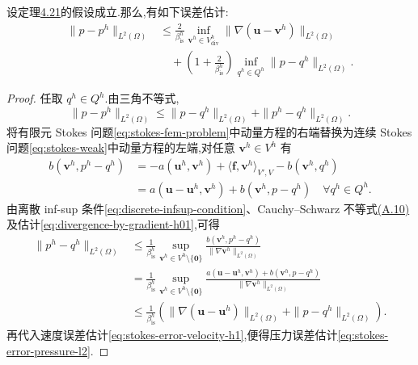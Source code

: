 \begin{theorem}\label{thm:stokes-error-pressure-l2}
设定理\hyperref[thm:stokes-error-velocity-h1]{4.21}的假设成立.那么,有如下误差估计:
\begin{equation}\label{eq:stokes-error-pressure-l2}
\begin{aligned}
  \|p-p^h\|_{L^2(\Omega)}
   &\leq\frac{2}{\beta_{\mathrm{is}}^h}
      \inf_{\bm{v}^h\in V_{\mathrm{div}}^h}
        \|\nabla(\bm{u}-\bm{v}^h)\|_{L^2(\Omega)}\\
   &\quad+\left(1+\frac{2}{\beta_{\mathrm{is}}^h}\right)
      \inf_{q^h\in Q^h}\|p-q^h\|_{L^2(\Omega)}.
\end{aligned}
\end{equation}
\end{theorem}
\begin{proof}
任取 $q^h\in Q^h$.由三角不等式,
\[
  \|p-p^h\|_{L^2(\Omega)}
   \leq\|p-q^h\|_{L^2(\Omega)}
       +\|p^h-q^h\|_{L^2(\Omega)}.
\]
将有限元 Stokes 问题\cref{eq:stokes-fem-problem}中动量方程的右端替换为连续 Stokes 问题\cref{eq:stokes-weak}中动量方程的左端,对任意 $\bm{v}^h\in V^h$ 有
\[
\begin{aligned}
  b(\bm{v}^h,p^h-q^h)
   &=-a(\bm{u}^h,\bm{v}^h)
       +\langle\bm{f},\bm{v}^h\rangle_{V',V}
       -b(\bm{v}^h,q^h)\\
   &=a(\bm{u}-\bm{u}^h,\bm{v}^h)
       +b(\bm{v}^h,p-q^h)
       \quad\forall q^h\in Q^h.
\end{aligned}
\]
由离散 inf-sup 条件\cref{eq:discrete-infsup-condition}、Cauchy--Schwarz 不等式\hyperref[eq:appendix-a-10]{(A.10)}及估计\cref{eq:divergence-by-gradient-h01},可得
\[
\begin{aligned}
  \|p^h-q^h\|_{L^2(\Omega)}
   &\leq\frac{1}{\beta_{\mathrm{is}}^h}
       \sup_{\bm{v}^h\in V^h\setminus\{\bm{0}\}}
       \frac{b(\bm{v}^h,p^h-q^h)}
            {\|\nabla\bm{v}^h\|_{L^2(\Omega)}}\\
   &=\frac{1}{\beta_{\mathrm{is}}^h}
       \sup_{\bm{v}^h\in V^h\setminus\{\bm{0}\}}
       \frac{a(\bm{u}-\bm{u}^h,\bm{v}^h)
            +b(\bm{v}^h,p-q^h)}
            {\|\nabla\bm{v}^h\|_{L^2(\Omega)}}\\
   &\leq\frac{1}{\beta_{\mathrm{is}}^h}
       \left(\|\nabla(\bm{u}-\bm{u}^h)\|_{L^2(\Omega)}
             +\|p-q^h\|_{L^2(\Omega)}\right).
\end{aligned}
\]
再代入速度误差估计\cref{eq:stokes-error-velocity-h1},便得压力误差估计\cref{eq:stokes-error-pressure-l2}.
\end{proof}

